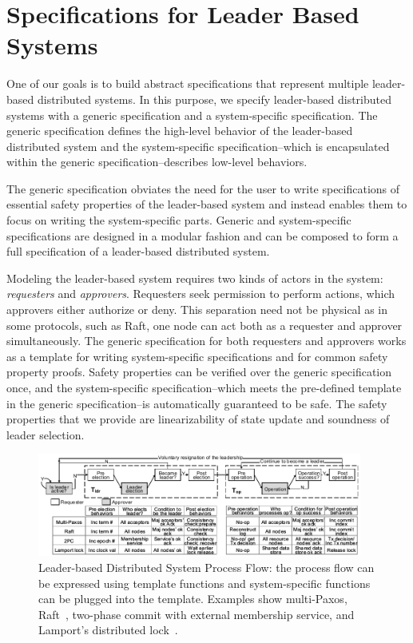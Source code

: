 
\section{Specifications for Leader Based Systems}
\label{chapter:witnesspassing:sec:specs-for-leader-based-system}

One of our goals is to build abstract specifications that represent multiple leader-based distributed systems.
In this purpose, we specify leader-based distributed systems with a generic
specification and a system-specific specification. 
The generic specification defines the high-level behavior of the leader-based 
distributed system and the system-specific specification--which is encapsulated within the generic specification--describes  low-level behaviors. 

The generic specification obviates the need for the user to write specifications
of essential safety properties of the leader-based system and instead enables them to
focus on writing the system-specific parts. 
Generic and system-specific specifications are designed in a modular fashion and
can be composed to form a full specification of a leader-based distributed system.

Modeling the leader-based system requires two kinds of actors in the system:
\textit{requesters} and \textit{approvers}. 
Requesters seek permission to perform actions, which approvers either authorize or deny.
This separation need not be physical as in some protocols, such as Raft, one node can act
both as a requester and approver simultaneously.
The generic specification for both requesters and approvers 
works as a template for writing system-specific
specifications and for common safety property proofs.
Safety properties can be verified over the generic specification once,
and the system-specific specification--which meets the pre-defined template in the generic specification--is automatically guaranteed to be safe. The safety
properties that we provide are linearizability of state update and
soundness of leader selection.


\begin{figure}
\includegraphics[width=0.95\textwidth]{figs/witnesspassing/overviewfig}
\caption{Leader-based Distributed System Process Flow: the process flow can be
	expressed using template functions and system-specific functions can
	be plugged into the template. Examples show multi-Paxos, 
	Raft~\cite{raft}, two-phase commit with external membership service, 
	and Lamport's distributed lock~\cite{lamportclock}.}
\label{fig:chapter:witnesspassing:process-flow}
\end{figure}

